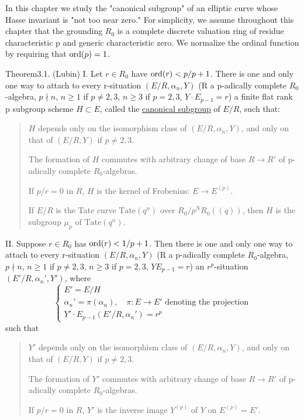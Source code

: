 
In this chapter we study the "canonical subgroup" of an elliptic curve whose
Hasse invariant is "not too near zero." For simplicity, we assume throughout
this chapter that the grounding $R_0$ is a complete discrete valuation ring of
residue characteristic p and generic characteristic zero. We normalize the
ordinal function by requiring that $\operatorname{ord}(p)=1$.


\begin{kathm}{Theorem}{3.1.}
(Lubin) I. Let $r\in R_0$ have $\operatorname{ord}(r)<p/p+1$. There is one and only one way
to attach to every r-situation $(E/R,\alpha_n,Y)$ (R a p-adically complete
$R_0$-algebra, $p\nmid n$, $n\geq 1$ if $p\neq 2,3$, $n\geq 3$ if $p=2,3$,
$Y\cdot E_{p-1}=r$) a finite flat rank p subgroup scheme $H\subset E$, called
the \uline{canonical subgroup} of $E/R$, such that:
\begin{quote}
$H$ depends only on the isomorphism class of $(E/R,\alpha_n,Y)$, and only on
that of $(E/R,Y)$ if $p\neq 2,3$.

The formation of $H$ commutes with arbitrary change of base $R\to R'$ of
p-adically complete $R_0$-algebras.

If $p/r=0$ in $R$, $H$ is the kernel of Frobenius: $E\to E^{(p)}$.

If $E/R$ is the Tate curve $\mathrm{Tate}(q^n)$ over $R_0/p^N R_0((q))$, then
$H$ is the subgroup $\mu_p$ of $\mathrm{Tate}(q^n)$.
\end{quote}
II. Suppose $r\in R_0$ has $\operatorname{ord}(r)<1/p+1$. Then there is one and only one way
to attach to every r-situation $(E/R,\alpha_n,Y)$ (R a p-adically complete
$R_0$-algebra, $p\nmid n$, $n\geq 1$ if $p\neq 2,3$, $n\geq 3$ if $p=2,3$,
$Y E_{p-1}=r$) an $r^p$-situation $(E'/R,\alpha_n',Y')$, where
\[
\begin{cases}
E' = E/H \\
\alpha_n' = \pi(\alpha_n), \quad \pi\colon E\to E' \text{ denoting the projection} \\
Y'\cdot E_{p-1}(E'/R,\alpha_n') = r^p
\end{cases}
\]
such that
\begin{quote}
$Y'$ depends only on the isomorphism class of $(E/R,\alpha_n,Y)$, and only on
that of $(E/R,Y)$ if $p\neq 2,3$.

The formation of $Y'$ commutes with arbitrary change of base $R\to R'$ of
p-adically complete $R_0$-algebras.

If $p/r=0$ in $R$, $Y'$ is the inverse image $Y^{(p)}$ of $Y$ on $E^{(p)}=E'$.
\end{quote}
\end{kathm}

